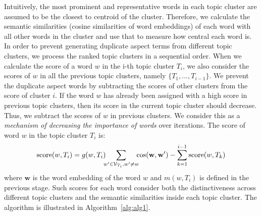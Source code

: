 Intuitively, the most prominent and representative words in each topic cluster
are assumed to be the closest to centroid of the cluster.
Therefore, we calculate the semantic similarities (cosine similarities of word embeddings) of each word with all other  words in the cluster and use that to measure how central each word is. 
In order to prevent generating duplicate aspect terms from different topic clusters,
we process the ranked topic clusters in a sequential order. 
When we calculate the score of a word $w$ in the i-th topic cluster $T_i$,
we also consider the scores of $w$ in all the previous topic clusters, namely $\{T_{1}, ..., T_{i-1}\}$. 
We prevent the duplicate aspect words by subtracting the scores 
of other clusters from the score of cluster $i$.
If the word $w$ has already been assigned with a high score in previous topic clusters, then its score in the current topic cluster should decrease. 
Thus, we subtract the scores of $w$ in previous clusters.
We consider this as a \textit{mechanism of decreasing the importance of words} over iterations.
The score of word $w$ in the topic cluster $T_i$ is:
\begin{equation}
\begin{split}
\text{score}(w,T_i) =
g(w, T_i)  \hspace{-5pt} \sum_{w' \in \mathcal{V}_{T_i}, w'\ne w} \hspace{-5pt} \cos ({{\mathbf w}, {\mathbf w'}}) -\sum_{k=1}^{i-1} \text{score}(w,T_k)
\end{split}
\label{eq:wordscore}
\end{equation}
where $\mathbf{w}$ is the word embedding of the word $w$ and
$m(w,T_i)$ is defined in the previous stage.
Such scores for each word consider both the distinctiveness across different topic clusters and the semantic similarities inside each topic cluster. 
The algorithm is illustrated in Algorithm~\ref{alg:alg1}.

